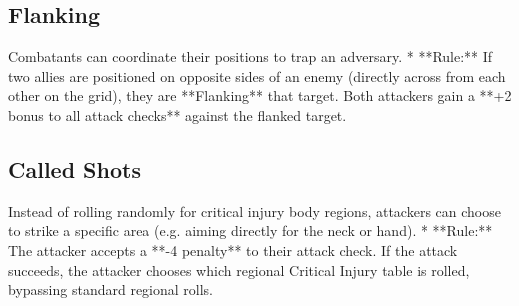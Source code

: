 \subsection{Flanking}
Combatants can coordinate their positions to trap an adversary.
*   **Rule:** If two allies are positioned on opposite sides of an enemy (directly across from each other on the grid), they are **Flanking** that target. Both attackers gain a **+2 bonus to all attack checks** against the flanked target.

\subsection{Called Shots}
Instead of rolling randomly for critical injury body regions, attackers can choose to strike a specific area (e.g. aiming directly for the neck or hand).
*   **Rule:** The attacker accepts a **-4 penalty** to their attack check. If the attack succeeds, the attacker chooses which regional Critical Injury table is rolled, bypassing standard regional rolls.
